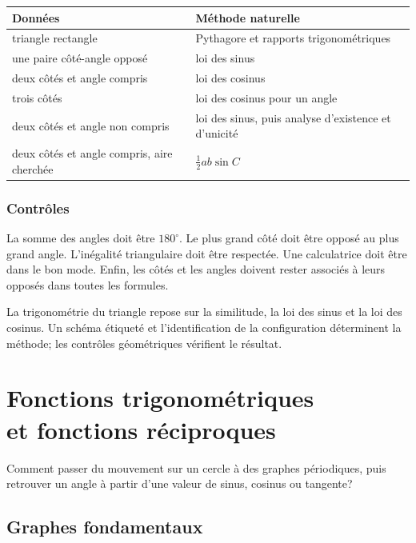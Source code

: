\documentclass[12pt,a4paper,openany]{book}
\begin{document}
\begin{center}
\begin{tabularx}{\textwidth}{@{}lY@{}}
\toprule
Données & Méthode naturelle\\\midrule
triangle rectangle & Pythagore et rapports trigonométriques\\
une paire côté-angle opposé & loi des sinus\\
deux côtés et angle compris & loi des cosinus\\
trois côtés & loi des cosinus pour un angle\\
deux côtés et angle non compris & loi des sinus, puis analyse d'existence et d'unicité\\
deux côtés et angle compris, aire cherchée & $\frac12ab\sin C$\\
\bottomrule
\end{tabularx}
\end{center}

\subsection{Contrôles}

La somme des angles doit être $180^\circ$. Le plus grand côté doit être opposé au plus grand angle. L'inégalité triangulaire doit être respectée. Une calculatrice doit être dans le bon mode. Enfin, les côtés et les angles doivent rester associés à leurs opposés dans toutes les formules.

\begin{summarybox}
La trigonométrie du triangle repose sur la similitude, la loi des sinus et la loi des cosinus. Un schéma étiqueté et l'identification de la configuration déterminent la méthode; les contrôles géométriques vérifient le résultat.
\end{summarybox}


\chapter[Fonctions trigonométriques et fonctions réciproques]{Fonctions trigonométriques\\et fonctions réciproques}

\begin{questionbox}
Comment passer du mouvement sur un cercle à des graphes périodiques, puis retrouver un angle à partir d'une valeur de sinus, cosinus ou tangente?
\end{questionbox}

\section{Graphes fondamentaux}
\end{document}
